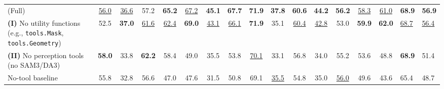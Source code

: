 \begin{table}[t]
{\begin{tabular}{l CCCC !{\hskip 8pt} CCC !{\hskip 8pt} CCC !{\hskip 8pt} CCCC !{\hskip 8pt} Y !{\hskip 8pt} >{}Z}
   & 
   & 
   & 
   & 
   & 
   & 
   & 
   &  \\
  \midrule
  \ours{} (Full)
    & \underline{56.0} & \underline{36.6} & 57.2 & \textbf{65.2} & \underline{67.2} & \textbf{45.1} & \textbf{67.7} & \textbf{71.9} & \textbf{37.8} & \textbf{60.6} & \textbf{44.2} & \textbf{56.2} & \underline{58.3} & \underline{61.0} & \textbf{68.9} & \textbf{56.9} \\
  \midrule
  \textbf{(I)} No utility functions (e.g., \texttt{tools.Mask}, \texttt{tools.Geometry})
    & 52.5 & \textbf{37.0} & \underline{61.6} & \underline{62.4} & \textbf{69.0} & \underline{43.1} & \underline{66.1} & \textbf{71.9} & 35.1 & \underline{60.4} & \underline{42.8} & 53.0 & \textbf{59.9} & \textbf{62.0} & \underline{68.7} & \underline{56.4} \\
  \textbf{(II)} No perception tools (no SAM3/DA3)
    & \textbf{58.0} & 33.8 & \textbf{62.2} & 58.4 & 49.0 & 35.5 & 53.8 & \underline{70.1} & 33.1 & 56.8 & 34.0 & 55.2 & 53.6 & 48.8 & \textbf{68.9} & 51.4 \\
  \midrule
  No-tool baseline
    & 55.8 & 32.8 & 56.6 & 47.0 & 47.6 & 31.5 & 50.8 & 69.1 & \underline{35.5} & 54.8 & 35.0 & \underline{56.0} & 49.6 & 43.6 & 65.4 & 48.7 \\
  \bottomrule
  \end{tabular}}
\end{table}
